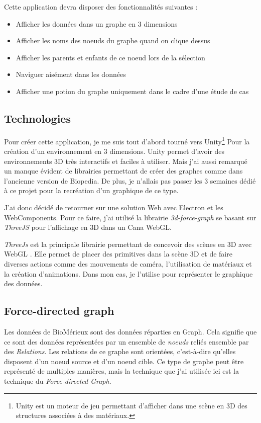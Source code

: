 Cette application devra disposer des fonctionnalités suivantes :

\begin{itemize}
    \item Afficher les données dans un graphe en 3 dimensions
    \item Afficher les noms des noeuds du graphe quand on clique dessus
    \item Afficher les parents et enfants de ce noeud lors de la sélection
    \item Naviguer aisément dans les données
    \item Afficher une potion du graphe uniquement dans le cadre d'une étude de cas
\end{itemize}

\subsection{Technologies}
\label{biomerieuxBiopediaTéchnologies}

Pour créer cette application, je me suis tout d'abord tourné vers Unity\footnote{Unity est un moteur de jeu permettant d'afficher dans une scène en 3D des structures associées à des matériaux.} Pour la création d'un environnement en 3 dimensions.
Unity permet d'avoir des environnements 3D très interactifs et faciles à utiliser.
Mais j'ai aussi remarqué un manque évident de librairies permettant de créer des graphes comme dans l'ancienne version de Biopedia.
De plus, je n'allais pas passer les 3 semaines dédié à ce projet pour la recréation d'un graphique de ce type.

J'ai donc décidé de retourner sur une solution Web avec Electron et les WebComponents.
Pour ce faire, j'ai utilisé la librairie \emph{3d-force-graph} se basant sur \emph{ThreeJS} pour l'affichage en 3D dans un Cana WebGL.

\emph{ThreeJs} est la principale librairie permettant de concevoir des scènes en 3D avec WebGL .
Elle permet de placer des primitives dans la scène 3D et de faire diverses actions comme des mouvements de caméra, l'utilisation de matériaux et la création d'animations.
Dans mon cas, je l'utilise pour représenter le graphique des données.

\subsection{Force-directed graph}
\label{biomerieuxBiopediaForceDirectedGraph}

Les données de BioMérieux sont des données réparties en Graph.
Cela signifie que ce sont des données représentées par un ensemble de \emph{noeuds} reliés ensemble par des \emph{Relations}.
Les relations de ce graphe sont orientées, c'est-à-dire qu'elles disposent d'un noeud source et d'un noeud cible.
Ce type de graphe peut être représenté de multiples manières, mais la technique que j'ai utilisée ici est la technique du \emph{Force-directed Graph}.

